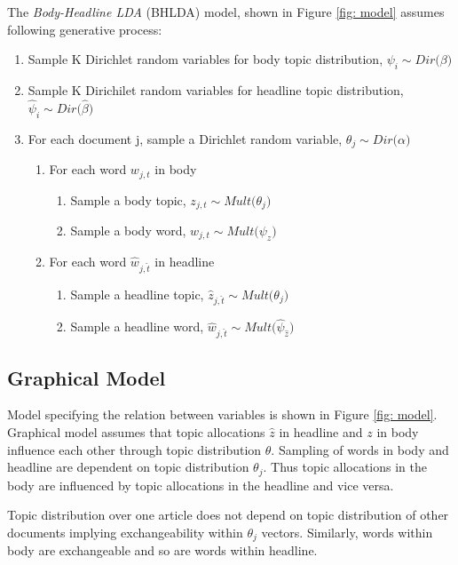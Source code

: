 \documentclass[a4paper]{article}
\begin{document}
The \textit{Body-Headline LDA} (BHLDA) model, shown in Figure \ref{fig: model} assumes following generative process:
\begin{enumerate}
\item Sample K Dirichlet random variables for body topic distribution, $\psi_{i} \sim \textit{Dir($\beta$)}$
\item Sample K Dirichilet random variables for headline topic distribution, $\hat{\psi}_{i} \sim \textit{Dir($\hat{\beta}$)}$ 
\item For each document j, sample a Dirichlet random variable, $\theta_{j} \sim \textit{Dir($\alpha$)}$
\begin{enumerate}[label =(\alph*)]
\item For each word $w_{j,t}$ in body
\begin{enumerate}
\item Sample a body topic, $z_{j,t} \sim \textit{Mult($\theta_{j}$)}$
\item Sample a body word, $w_{j,t} \sim \textit{Mult($\psi_{z}$)}$
\end{enumerate}
\item For each word $\hat{w}_{j,\hat{t}}$ in headline
\begin{enumerate}
\item Sample a headline topic, $\hat{z}_{j,\hat{t}} \sim \textit{Mult($\theta_{j}$)}$
\item Sample a headline word, $\hat{w}_{j,\hat{t}} \sim \textit{Mult($\hat{\psi}_{\hat{z}}$)}$
\end{enumerate} 
\end{enumerate}
\end{enumerate}

\subsection{Graphical Model}
Model specifying the relation between variables is shown in Figure \ref{fig: model}. Graphical model assumes that topic allocations $\hat{z}$  in headline and $z$ in body  influence each other through topic distribution $\theta$. Sampling of words in body and headline are dependent on topic distribution $\theta_{j}$. Thus topic allocations in the body are influenced by topic allocations in the headline and vice versa.

Topic distribution over one article does not depend on topic distribution of other documents implying exchangeability within $\theta_{j}$ vectors. Similarly, words within body are exchangeable and so are words within headline. 
\end{document}
